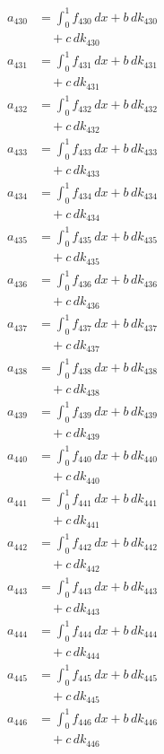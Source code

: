 \documentclass{article}
\begin{document}
\begin{align}
a_{430} &= \int_0^1 f_{430}\,dx + b\,dk_{430} \\
&\quad + c\,dk_{430} \\
a_{431} &= \int_0^1 f_{431}\,dx + b\,dk_{431} \\
&\quad + c\,dk_{431} \\
a_{432} &= \int_0^1 f_{432}\,dx + b\,dk_{432} \\
&\quad + c\,dk_{432} \\
a_{433} &= \int_0^1 f_{433}\,dx + b\,dk_{433} \\
&\quad + c\,dk_{433} \\
a_{434} &= \int_0^1 f_{434}\,dx + b\,dk_{434} \\
&\quad + c\,dk_{434} \\
a_{435} &= \int_0^1 f_{435}\,dx + b\,dk_{435} \\
&\quad + c\,dk_{435} \\
a_{436} &= \int_0^1 f_{436}\,dx + b\,dk_{436} \\
&\quad + c\,dk_{436} \\
a_{437} &= \int_0^1 f_{437}\,dx + b\,dk_{437} \\
&\quad + c\,dk_{437} \\
a_{438} &= \int_0^1 f_{438}\,dx + b\,dk_{438} \\
&\quad + c\,dk_{438} \\
a_{439} &= \int_0^1 f_{439}\,dx + b\,dk_{439} \\
&\quad + c\,dk_{439} \\
a_{440} &= \int_0^1 f_{440}\,dx + b\,dk_{440} \\
&\quad + c\,dk_{440} \\
a_{441} &= \int_0^1 f_{441}\,dx + b\,dk_{441} \\
&\quad + c\,dk_{441} \\
a_{442} &= \int_0^1 f_{442}\,dx + b\,dk_{442} \\
&\quad + c\,dk_{442} \\
a_{443} &= \int_0^1 f_{443}\,dx + b\,dk_{443} \\
&\quad + c\,dk_{443} \\
a_{444} &= \int_0^1 f_{444}\,dx + b\,dk_{444} \\
&\quad + c\,dk_{444} \\
a_{445} &= \int_0^1 f_{445}\,dx + b\,dk_{445} \\
&\quad + c\,dk_{445} \\
a_{446} &= \int_0^1 f_{446}\,dx + b\,dk_{446} \\
&\quad + c\,dk_{446} \\

\end{align}
\end{document}
